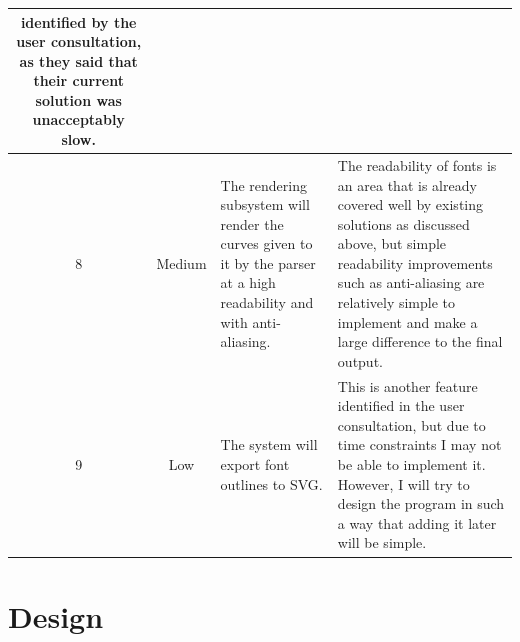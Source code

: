 \documentclass{report}
\begin{document}
\begin{center}
\begin{longtable}{c|c|p{3cm}|p{6.5cm}}
                                                    identified by the user
                                                    consultation, as they said
                                                    that their current solution
                                                    was unacceptably slow. \\
    \hline
    8 & Medium & The rendering subsystem will render the curves given to it by
                 the parser at a high readability and with anti-aliasing.
                                                  & The readability of fonts is
                                                    an area that is already
                                                    covered well by existing
                                                    solutions as discussed
                                                    above, but simple
                                                    readability improvements
                                                    such as anti-aliasing are
                                                    relatively simple to
                                                    implement and make a
                                                    large difference to the final
                                                    output. \\
    \hline
    9 & Low & The system will export font outlines to SVG. & This is another
                                                            feature identified
                                                            in the user
                                                            consultation, but
                                                            due to time
                                                            constraints I may
                                                            not be able to
                                                            implement it.
                                                            However, I will try
                                                            to design the
                                                            program in such a
                                                            way that adding it
                                                            later will be simple. 

  \end{longtable}
\end{center}


\chapter{Design}
\end{document}
